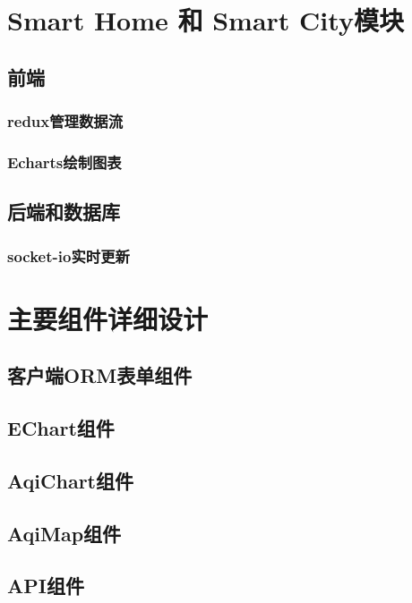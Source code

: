 \section{Smart Home 和 Smart City模块}
\subsection{前端}
\subsubsection{redux管理数据流}
\subsubsection{Echarts绘制图表}
\subsection{后端和数据库}
\subsubsection{socket-io实时更新}
\section{主要组件详细设计}
\subsection{客户端ORM表单组件}
\subsection{EChart组件}
\subsection{AqiChart组件}
\subsection{AqiMap组件}
\subsection{API组件}
